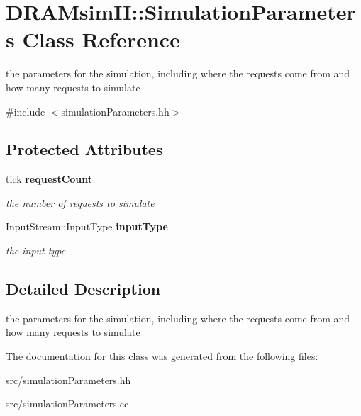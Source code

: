 \section{DRAMsimII::SimulationParameters Class Reference}
\label{class_d_r_a_msim_i_i_1_1_simulation_parameters}


the parameters for the simulation, including where the requests come from and how many requests to simulate  




{\ttfamily \#include $<$simulationParameters.hh$>$}

\subsection*{Protected Attributes}
\begin{DoxyCompactItemize}
\item 
tick {\bf requestCount}\label{class_d_r_a_msim_i_i_1_1_simulation_parameters_a348bf65bc4e540f16bec50b02f2bf39e}

\begin{DoxyCompactList}\small\item\em the number of requests to simulate \item\end{DoxyCompactList}\item 
InputStream::InputType {\bf inputType}\label{class_d_r_a_msim_i_i_1_1_simulation_parameters_af495ba14ce2d58a65a35ff5d6222c645}

\begin{DoxyCompactList}\small\item\em the input type \item\end{DoxyCompactList}\end{DoxyCompactItemize}


\subsection{Detailed Description}
the parameters for the simulation, including where the requests come from and how many requests to simulate 

The documentation for this class was generated from the following files:\begin{DoxyCompactItemize}
\item 
src/simulationParameters.hh\item 
src/simulationParameters.cc\end{DoxyCompactItemize}
